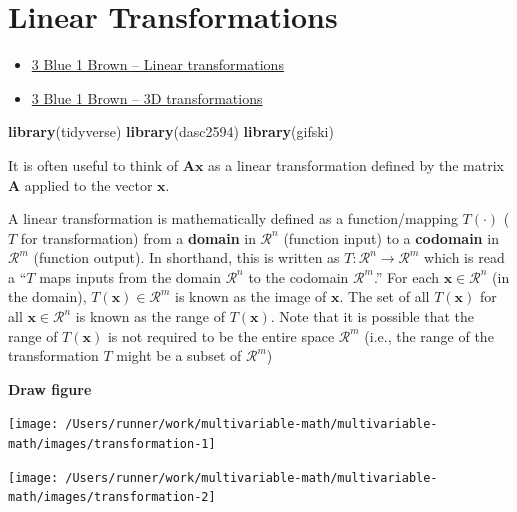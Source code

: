\documentclass[
]{book}
\newenvironment{Shaded}{\begin{snugshade}}{\end{snugshade}}
\newcommand{\KeywordTok}[1]{\textcolor[rgb]{0.13,0.29,0.53}{\textbf{#1}}}
\newcommand{\NormalTok}[1]{#1}
\theoremstyle{definition}
\theoremstyle{definition}
\theoremstyle{definition}
\theoremstyle{remark}
\begin{document}
\hypertarget{linear-transformations}{%
\chapter{Linear Transformations}\label{linear-transformations}}

\begin{itemize}
\item
  \href{https://www.3blue1brown.com/lessons/linear-transformations}{3 Blue 1 Brown -- Linear transformations}
\item
  \href{https://www.3blue1brown.com/lessons/3d-transformations}{3 Blue 1 Brown -- 3D transformations}
\end{itemize}

\begin{Shaded}
\begin{Highlighting}[]
\KeywordTok{library}\NormalTok{(tidyverse)}
\KeywordTok{library}\NormalTok{(dasc2594)}
\KeywordTok{library}\NormalTok{(gifski)}
\end{Highlighting}
\end{Shaded}

It is often useful to think of \(\mathbf{A}\mathbf{x}\) as a linear transformation defined by the matrix \(\mathbf{A}\) applied to the vector \(\mathbf{x}\).

A linear transformation is mathematically defined as a function/mapping \(T(\cdot)\) (\(T\) for transformation) from a \textbf{domain} in \(\mathcal{R}^n\) (function input) to a \textbf{codomain} in \(\mathcal{R}^m\) (function output). In shorthand, this is written as \(T:\mathcal{R}^n \rightarrow \mathcal{R}^m\) which is read a ``\(T\) maps inputs from the domain \(\mathcal{R}^n\) to the codomain \(\mathcal{R}^m\).'' For each \(\mathbf{x} \in \mathcal{R}^n\) (in the domain), \(T(\mathbf{x}) \in \mathcal{R}^m\) is known as the image of \(\mathbf{x}\). The set of all \(T(\mathbf{x})\) for all \(\mathbf{x} \in \mathcal{R}^n\) is known as the range of \(T(\mathbf{x})\). Note that it is possible that the range of \(T(\mathbf{x})\) is not required to be the entire space \(\mathcal{R}^m\) (i.e., the range of the transformation \(T\) might be a subset of \(\mathcal{R}^m\))

\textbf{Draw figure}

\texttt{[image: /Users/runner/work/multivariable-math/multivariable-math/images/transformation-1]}

\texttt{[image: /Users/runner/work/multivariable-math/multivariable-math/images/transformation-2]}
\end{document}
